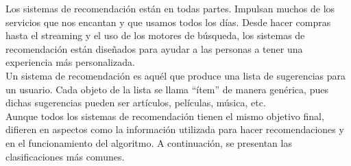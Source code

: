     Los sistemas de recomendación están en todas partes. Impulsan muchos de los servicios que nos encantan y que usamos todos los días. 
    Desde hacer compras hasta el streaming y el uso de los motores de búsqueda, los sistemas de recomendación están diseñados para 
    ayudar a las personas a tener una experiencia más personalizada.\\
    \newline
    Un sistema de recomendación es aquél que produce una lista de sugerencias para un usuario. Cada objeto de la lista se llama “ítem” 
    de manera genérica, pues dichas sugerencias pueden ser artículos, películas, música, etc.\\
    \newline
    Aunque todos los sistemas de recomendación tienen el mismo objetivo final, difieren en aspectos como la información utilizada para 
    hacer recomendaciones y en el funcionamiento del algoritmo. A continuación, se presentan las clasificaciones más comunes.
    
